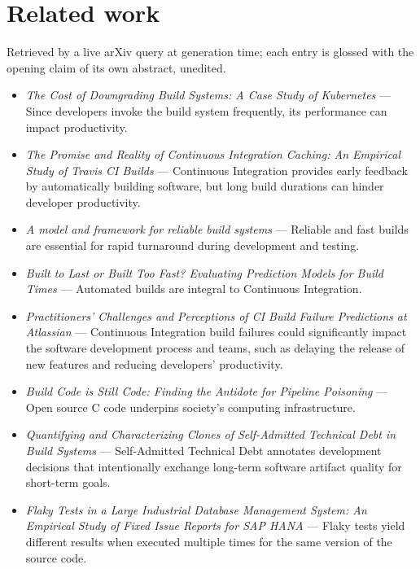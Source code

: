 \documentclass[11pt,a4paper]{article}
\providecommand{\textcite}[1]{\cite{#1}}
\begin{document}
\section{Related work}
\noindent Retrieved by a live arXiv query at generation time; each entry is glossed with the opening claim of its own abstract, unedited.

\begin{itemize}[leftmargin=1.3em,itemsep=2pt]
\item \textcite{arxiv2510_20041} \emph{The Cost of Downgrading Build Systems: A Case Study of Kubernetes} --- Since developers invoke the build system frequently, its performance can impact productivity.
\item \textcite{arxiv2601_19146} \emph{The Promise and Reality of Continuous Integration Caching: An Empirical Study of Travis CI Builds} --- Continuous Integration provides early feedback by automatically building software, but long build durations can hinder developer productivity.
\item \textcite{arxiv1203_2704} \emph{A model and framework for reliable build systems} --- Reliable and fast builds are essential for rapid turnaround during development and testing.
\item \textcite{arxiv1712_06796} \emph{Built to Last or Built Too Fast? Evaluating Prediction Models for Build Times} --- Automated builds are integral to Continuous Integration.
\item \textcite{arxiv2402_09651} \emph{Practitioners' Challenges and Perceptions of CI Build Failure Predictions at Atlassian} --- Continuous Integration build failures could significantly impact the software development process and teams, such as delaying the release of new features and reducing developers' productivity.
\item \textcite{arxiv2601_08995} \emph{Build Code is Still Code: Finding the Antidote for Pipeline Poisoning} --- Open source C code underpins society's computing infrastructure.
\item \textcite{arxiv2402_08920} \emph{Quantifying and Characterizing Clones of Self-Admitted Technical Debt in Build Systems} --- Self-Admitted Technical Debt annotates development decisions that intentionally exchange long-term software artifact quality for short-term goals.
\item \textcite{arxiv2602_03556} \emph{Flaky Tests in a Large Industrial Database Management System: An Empirical Study of Fixed Issue Reports for SAP HANA} --- Flaky tests yield different results when executed multiple times for the same version of the source code.

\end{itemize}
\end{document}
